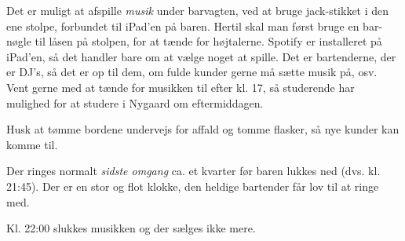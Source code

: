Det er muligt at afspille \textit{musik} under barvagten, ved at bruge
jack-stikket i den ene stolpe, forbundet til iPad'en på baren.
Hertil skal man først bruge en bar-nøgle
til låsen på stolpen, for at tænde for højtalerne.
Spotify er installeret på iPad'en, så det handler bare om at vælge noget at spille.
Det er bartenderne, der er DJ's, så det er op til dem,
om fulde kunder gerne må sætte musik på, osv.
Vent gerne med at tænde for musikken til efter kl. 17, så studerende har mulighed
for at studere i Nygaard om eftermiddagen.

Husk at tømme bordene undervejs for affald og tomme flasker, så nye
kunder kan komme til.

Der ringes normalt \textit{sidste omgang}
ca. et kvarter før baren lukkes ned
(dvs. kl. 21:45). Der er en stor og flot klokke, den heldige bartender
får lov til at ringe med.

Kl. 22:00 slukkes musikken og der sælges ikke mere.
